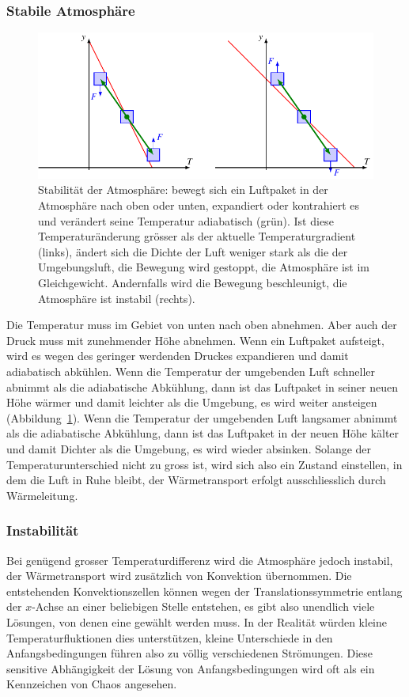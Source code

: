 \subsubsection{Stabile Atmosphäre}
\begin{figure}
\centering
\includegraphics{chapters/2/lorenz-stabil.pdf}
\caption{Stabilität der Atmosphäre: bewegt sich ein Luftpaket in der
Atmosphäre nach oben oder unten, expandiert oder kontrahiert es und
verändert seine Temperatur adiabatisch (grün).
Ist diese Temperaturänderung grösser als der aktuelle Temperaturgradient
(links),
ändert sich die Dichte der Luft weniger stark als die der Umgebungsluft,
die Bewegung wird gestoppt, die Atmosphäre ist im Gleichgewicht.
Andernfalls wird die Bewegung beschleunigt, die Atmosphäre ist instabil
(rechts).
\label{skript:stabilitaet der atmosphaere}}
\end{figure}
Die Temperatur muss im Gebiet von unten nach oben abnehmen.
Aber auch der Druck muss mit zunehmender Höhe abnehmen. 
Wenn ein Luftpaket aufsteigt, wird es wegen des geringer werdenden
Druckes expandieren und damit adiabatisch abkühlen.
Wenn die Temperatur der umgebenden Luft schneller abnimmt als die
adiabatische Abkühlung, dann ist das Luftpaket in seiner neuen Höhe
wärmer und damit leichter als die Umgebung, es wird weiter ansteigen
(Abbildung~\ref{skript:stabilitaet der atmosphaere}).
Wenn die Temperatur der umgebenden Luft langsamer abnimmt als die
adiabatische Abkühlung, dann ist das Luftpaket in der neuen Höhe 
kälter und damit Dichter als die Umgebung, es wird wieder absinken.
Solange der Temperaturunterschied nicht zu gross ist, wird sich also ein
Zustand einstellen, in dem die Luft in Ruhe bleibt, der Wärmetransport
erfolgt ausschliesslich durch Wärmeleitung.

\subsubsection{Instabilität}
Bei genügend grosser Temperaturdifferenz wird die Atmosphäre jedoch
instabil, der Wärmetransport wird zusätzlich von Konvektion übernommen.
Die entstehenden Konvektionszellen können wegen der Translationssymmetrie
entlang der $x$-Achse an einer beliebigen Stelle entstehen, es gibt also
unendlich viele Lösungen, von denen eine gewählt werden muss.
In der Realität würden kleine Temperaturfluktionen dies unterstützen,
kleine Unterschiede in den Anfangsbedingungen führen also zu völlig
verschiedenen Strömungen.
Diese sensitive Abhängigkeit der Lösung von Anfangsbedingungen wird
oft als ein Kennzeichen von Chaos angesehen.

